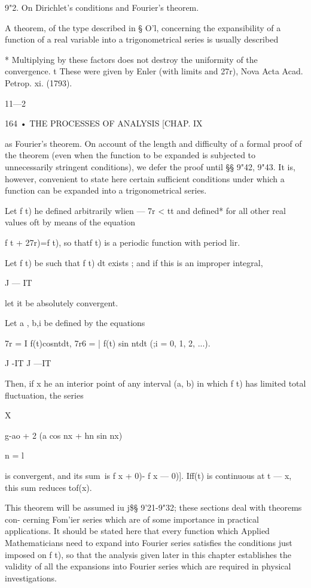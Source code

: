 9"2. On Dirichlet's conditions and Fourier's theorem. 

A theorem, of the type described in § O'l, concerning the expansibility of 
a function of a real variable into a trigonometrical series is usually described 

* Multiplying by these factors does not destroy the uniformity of the convergence. 
t These were given by Enler (with limits and 27r), Nova Acta Acad. Petrop. xi. (1793). 

11—2 



164 • THE PROCESSES OF ANALYSIS [CHAP. IX 

as Fourier's theorem. On account of the length and difficulty of a formal 
proof of the theorem (even when the function to be expanded is subjected to 
unnecessarily stringent conditions), we defer the proof until §§ 9"42, 9"43. It is, 
however, convenient to state here certain sufficient conditions under which 
a function can be expanded into a trigonometrical series. 

Let f t) he defined arbitrarily wlien — 7r < tt and defined* for all other 
real values oft by means of the equation 

f t + 27r)=f t), 
so thatf t) is a periodic function with period lir. 



Let f t) be such that f t) dt exists ; and if this is an improper integral, 

J — IT 

let it be absolutely convergent. 

Let a , b,i be defined by the equations  

7r   = I f(t)cosntdt, 7r6 = | f(t) sin ntdt (;i = 0, 1, 2, ...). 

J -IT J —IT 

Then, if x he an interior point of any interval (a, b) in which f t) has 
limited total fluctuation, the series 

X 

 g-ao + 2 (a  cos nx + hn sin nx) 

n = l 

is convergent, and its sum\ is   f x + 0)- f x — 0)]. Iff(t) is continuous 
at t — x, this sum reduces tof(x). 

This theorem will be assumed iu j\$§ 9'21-9"32; these sections deal with theorems con- 
cerning Fom'ier series which are of some importance in practical applications. It should 
be stated here that every function which Applied Mathematicians need to expand into 
Fourier series satisfies the conditions just imposed on f t), so that the analysis given later 
in this chapter establishes the validity of all the expansions into Fourier series which are 
required in physical investigations. 

